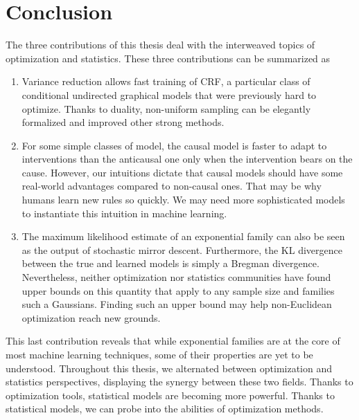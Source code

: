 \chapter{Conclusion}
\label{chap:discussion}

The three contributions of this thesis deal with the interweaved topics of optimization and statistics. 
These three contributions can be summarized as 
\begin{enumerate}
	\item Variance reduction allows fast training of CRF, a particular class of conditional undirected graphical models that were previously hard to optimize. Thanks to duality, non-uniform sampling can be elegantly formalized and improved other strong methods.
	\item For some simple classes of model, the causal model is faster to adapt to interventions than the anticausal one only when the intervention bears on the cause. 
	However, our intuitions dictate that causal models should have some real-world advantages compared to non-causal ones. 
	That may be why humans learn new rules so quickly.
	We may need more sophisticated models to instantiate this intuition in machine learning.
	\item The maximum likelihood estimate of an exponential family can also be seen as the output of stochastic mirror descent. Furthermore, the KL divergence between the true and learned models is simply a Bregman divergence. Nevertheless, neither optimization nor statistics communities have found upper bounds on this quantity that apply to any sample size and families such a Gaussians. 
	Finding such an upper bound may help non-Euclidean optimization reach new grounds.
\end{enumerate}
This last contribution reveals that while exponential families are at the core of most machine learning techniques, some of their properties are yet to be understood.
Throughout this thesis, we alternated between optimization and statistics perspectives, displaying the synergy between these two fields. Thanks to optimization tools, statistical models are becoming more powerful. Thanks to statistical models, we can probe into the abilities of optimization methods.


